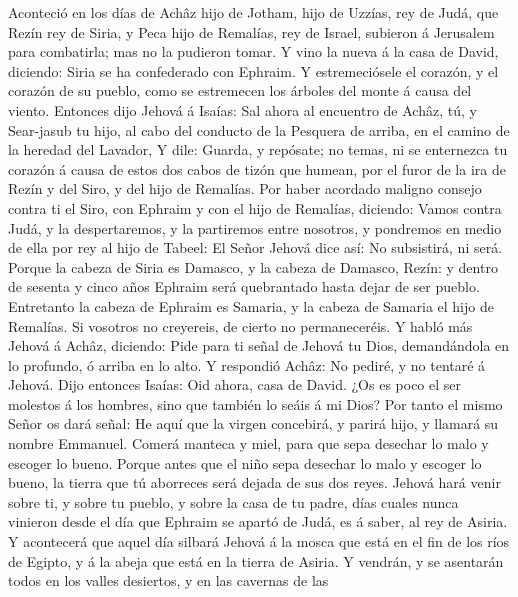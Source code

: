  Aconteció en los días de Achâz hijo de Jotham, hijo de
Uzzías, rey de Judá, que Rezín rey de Siria, y Peca hijo de Remalías,
rey de Israel, subieron á Jerusalem para combatirla; mas no la pudieron
tomar.  Y vino la nueva á la casa de David, diciendo: Siria
se ha confederado con Ephraim. Y estremeciósele el corazón, y el corazón
de su pueblo, como se estremecen los árboles del monte á causa del
viento.  Entonces dijo Jehová á Isaías: Sal ahora al
encuentro de Achâz, tú, y Sear-jasub tu hijo, al cabo del conducto de la
Pesquera de arriba, en el camino de la heredad del Lavador, 
Y dile: Guarda, y repósate; no temas, ni se enternezca tu corazón á
causa de estos dos cabos de tizón que humean, por el furor de la ira de
Rezín y del Siro, y del hijo de Remalías.  Por haber
acordado maligno consejo contra ti el Siro, con Ephraim y con el hijo de
Remalías, diciendo:  Vamos contra Judá, y la despertaremos,
y la partiremos entre nosotros, y pondremos en medio de ella por rey al
hijo de Tabeel:  El Señor Jehová dice así: No subsistirá, ni
será.  Porque la cabeza de Siria es Damasco, y la cabeza de
Damasco, Rezín: y dentro de sesenta y cinco años Ephraim será
quebrantado hasta dejar de ser pueblo.  Entretanto la cabeza
de Ephraim es Samaria, y la cabeza de Samaria el hijo de Remalías. Si
vosotros no creyereis, de cierto no permaneceréis.  Y habló
más Jehová á Achâz, diciendo:  Pide para ti señal de Jehová
tu Dios, demandándola en lo profundo, ó arriba en lo alto. 
Y respondió Achâz: No pediré, y no tentaré á Jehová.  Dijo
entonces Isaías: Oid ahora, casa de David. ¿Os es poco el ser molestos á
los hombres, sino que también lo seáis á mi Dios?  Por
tanto el mismo Señor os dará señal: He aquí que la virgen concebirá, y
parirá hijo, y llamará su nombre Emmanuel.  Comerá manteca
y miel, para que sepa desechar lo malo y escoger lo bueno. 
Porque antes que el niño sepa desechar lo malo y escoger lo bueno, la
tierra que tú aborreces será dejada de sus dos reyes. 
Jehová hará venir sobre ti, y sobre tu pueblo, y sobre la casa de tu
padre, días cuales nunca vinieron desde el día que Ephraim se apartó de
Judá, es á saber, al rey de Asiria.  Y acontecerá que aquel
día silbará Jehová á la mosca que está en el fin de los ríos de Egipto,
y á la abeja que está en la tierra de Asiria.  Y vendrán, y
se asentarán todos en los valles desiertos, y en las cavernas de las
